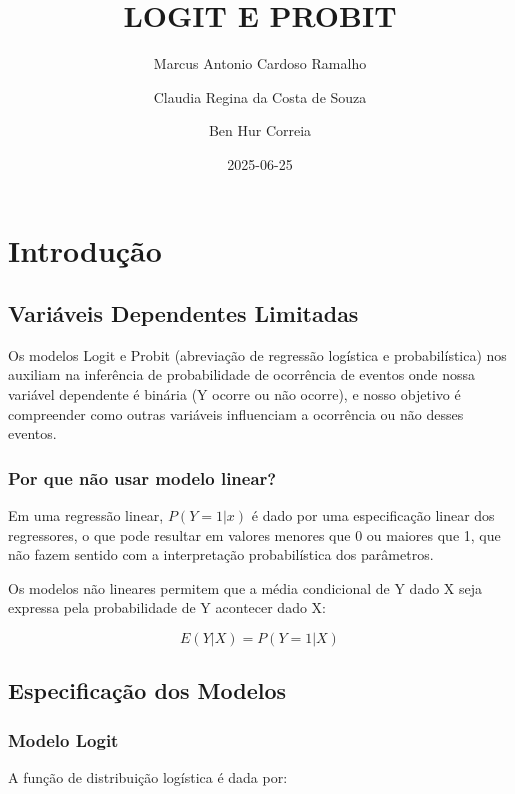 \documentclass[
  letterpaper,
  DIV=11,
  numbers=noendperiod]{scrartcl}
\title{LOGIT E PROBIT}
\author{Marcus Antonio Cardoso Ramalho \and Claudia Regina da Costa de
Souza \and Ben Hur Correia}
\date{2025-06-25}
\renewcommand*\contentsname{Índice}
\newcommand\contentsname{Índice}
\begin{document}
\maketitle

\renewcommand*\contentsname{Índice}
{
\hypersetup{linkcolor=}
\setcounter{tocdepth}{3}
\tableofcontents
}

\section{Introdução}\label{introduuxe7uxe3o}

\subsection{Variáveis Dependentes
Limitadas}\label{variuxe1veis-dependentes-limitadas}

Os modelos Logit e Probit (abreviação de regressão logística e
probabilística) nos auxiliam na inferência de probabilidade de
ocorrência de eventos onde nossa variável dependente é binária (Y ocorre
ou não ocorre), e nosso objetivo é compreender como outras variáveis
influenciam a ocorrência ou não desses eventos.

\subsubsection{Por que não usar modelo
linear?}\label{por-que-nuxe3o-usar-modelo-linear}

Em uma regressão linear, \(P(Y=1|x)\) é dado por uma especificação
linear dos regressores, o que pode resultar em valores menores que 0 ou
maiores que 1, que não fazem sentido com a interpretação probabilística
dos parâmetros.

Os modelos não lineares permitem que a média condicional de Y dado X
seja expressa pela probabilidade de Y acontecer dado X:

\[E(Y|X) = P(Y=1|X)\]

\subsection{Especificação dos
Modelos}\label{especificauxe7uxe3o-dos-modelos}

\subsubsection{Modelo Logit}\label{modelo-logit}

A função de distribuição logística é dada por:
\end{document}
